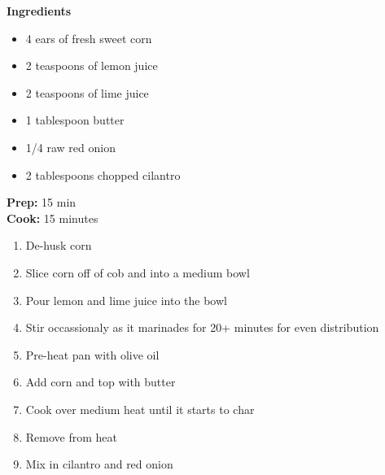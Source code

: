 \documentclass[a4paper]{article}
\newcommand{\ingredient}[1]{
  \item[]{#1}\\
}
\newcommand{\prep}[1]{
  \textbf{Prep:} {#1}\\
}
\newcommand{\cooking}[1]{
  \textbf{Cook:} {#1}\\
}
\newcommand{\hide}[1]
{}
\newenvironment{steps}
{%
  \begin{enumerate}[leftmargin=0.3cm]
}
{%
  \end{enumerate}
}
\newenvironment{ingredients}
{%
  \vspace{9pt}
  \begin{itemize}[nosep, itemsep=2pt, leftmargin=3pt]
}
{%
  \end{itemize}
}
\begin{document}
\begin{multicols}{3}
  \normalsize
  \raggedright
  \textbf{Ingredients}\\
  \begin{ingredients}
      \ingredient{4 ears of fresh sweet corn}
      \ingredient{2 teaspoons of lemon juice}
      \ingredient{2 teaspoons of lime juice}
      \ingredient{1 tablespoon butter}
      \ingredient{1/4 raw red onion}
      \ingredient{2 tablespoons chopped cilantro}
  \end{ingredients}
    \vspace{0.5cm}
    \prep{15 min}
    \cooking{15 minutes}
    \vspace{0pt}
  \columnbreak
  \begin{steps}
    \item{De-husk corn}
    \item{Slice corn off of cob and into a medium bowl}
    \item{Pour lemon and lime juice into the bowl}
    \item{Stir occassionaly as it marinades for 20+ minutes for even distribution} 
    \item{Pre-heat pan with olive oil} 
    \item{Add corn and top with butter} 
    \item{Cook over medium heat until it starts to char}
    \item{Remove from heat} 
    \item{Mix in cilantro and red onion} 
  \end{steps}
\end{multicols}

\hide{
}
\end{document}
